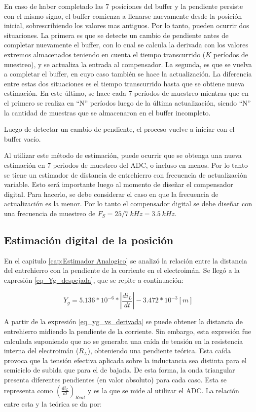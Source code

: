 En caso de haber completado las 7 posiciones del buffer y la pendiente persiste con el mismo signo, el buffer comienza a llenarse nuevamente desde la posición inicial, sobrescribiendo los valores mas antiguos. Por lo tanto, pueden ocurrir dos situaciones. La primera es que se detecte un cambio de pendiente antes de completar nuevamente el buffer, con lo cual se calcula la derivada con los valores extremos almacenados teniendo en cuenta el tiempo transcurrido ($K$ períodos de muestreo), y se actualiza la entrada al compensador. La segunda, es que se vuelva a completar el buffer, en cuyo caso también se hace la actualización. La diferencia entre estas dos situaciones es el tiempo transcurrido hasta que se obtiene nueva estimación. En este último, se hace cada 7 períodos de muestreo mientras que en el primero se realiza en “N” períodos luego de la última actualización, siendo “N” la cantidad de muestras que se almacenaron en el buffer incompleto.

Luego de detectar un cambio de pendiente, el
proceso vuelve a iniciar con el buffer vacío.

Al utilizar este método de estimación, puede ocurrir que se obtenga una nueva estimación en 7 periodos de muestreo del ADC, o incluso en menos. Por lo tanto se tiene un estimador de distancia de entrehierro con frecuencia de actualización variable. Esto será importante luego al momento de diseñar el compensador digital. Para hacerlo, se debe considerar el caso en que la frecuencia de actualización es la menor. Por lo tanto el compensador digital se debe diseñar con una frecuencia de muestreo de $F_S=25/7 \:kHz = 3.5\:kHz$.

\subsection{Estimación digital de la posición}

En el capitulo \ref{cap:Estimador Analogico} se analizó la relación entre la distancia del entrehierro con la pendiente de la corriente en el electroimán. Se llegó a la expresión \ref{eq_Yg_despejada}, que se repite a continuación:

\begin{equation} \label{eq_yg_vs_derivada}
	Y_g = 5.136*10^{-6}*|\frac{di_L}{dt}|- 3.472*10^{-3} [m]
\end{equation}

A partir de la expresión \ref{eq_yg_vs_derivada} se puede obtener la distancia de entrehierro midiendo la pendiente de la corriente. Sin embargo, esta expresión fue calculada suponiendo que no se generaba una caída de tensión en la resistencia interna del electroimán ($R_L$), obteniendo una pendiente teórica. Esta caída provoca que la tensión efectiva aplicada sobre la inductancia sea distinta para el semiciclo de subida que para el de bajada. De esta forma, la onda triangular presenta diferentes pendientes (en valor absoluto) para cada caso. Esta se representa como $(\frac{di_L}{dt})_{Real}$ y es la que se mide al utilizar el ADC. La relación entre esta y la teórica se da por:

